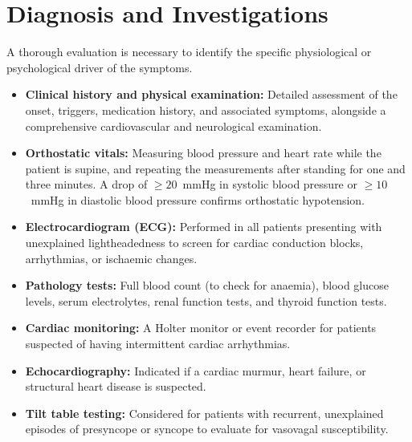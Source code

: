 \section*{Diagnosis and Investigations}
A thorough evaluation is necessary to identify the specific physiological or psychological driver of the symptoms.
\begin{itemize}
    \item \textbf{Clinical history and physical examination:} Detailed assessment of the onset, triggers, medication history, and associated symptoms, alongside a comprehensive cardiovascular and neurological examination.
    \item \textbf{Orthostatic vitals:} Measuring blood pressure and heart rate while the patient is supine, and repeating the measurements after standing for one and three minutes. A drop of $\ge 20$~mmHg in systolic blood pressure or $\ge 10$~mmHg in diastolic blood pressure confirms orthostatic hypotension.
    \item \textbf{Electrocardiogram (ECG):} Performed in all patients presenting with unexplained lightheadedness to screen for cardiac conduction blocks, arrhythmias, or ischaemic changes.
    \item \textbf{Pathology tests:} Full blood count (to check for anaemia), blood glucose levels, serum electrolytes, renal function tests, and thyroid function tests.
    \item \textbf{Cardiac monitoring:} A Holter monitor or event recorder for patients suspected of having intermittent cardiac arrhythmias.
    \item \textbf{Echocardiography:} Indicated if a cardiac murmur, heart failure, or structural heart disease is suspected.
    \item \textbf{Tilt table testing:} Considered for patients with recurrent, unexplained episodes of presyncope or syncope to evaluate for vasovagal susceptibility.
\end{itemize}

